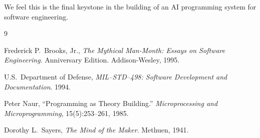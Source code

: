 \documentclass[12pt]{extarticle}
\begin{document}
We feel this is the final keystone in the building of an AI
programming system for software engineering.

\begingroup
\setlength{\parskip}{0pt}
\begin{thebibliography}{9}

Frederick P.\ Brooks, Jr., \emph{The Mythical Man-Month: Essays on
  Software Engineering}. Anniversary Edition. Addison-Wesley, 1995.

U.S.\ Department of Defense, \emph{MIL--STD--498: Software
  Development and Documentation}. 1994.

Peter Naur, ``Programming as Theory Building.''
\emph{Microprocessing and Microprogramming}, 15(5):253--261, 1985.

Dorothy L.\ Sayers, \emph{The Mind of the Maker}. Methuen, 1941.

\end{thebibliography}
\endgroup
\end{document}
